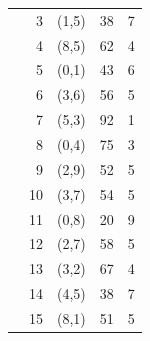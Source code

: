 \begin{longtable}{lrrrr}
 & 3 & (1,5) & 38 & 7 \\
 & 4 & (8,5) & 62 & 4 \\
 & 5 & (0,1) & 43 & 6 \\
 & 6 & (3,6) & 56 & 5 \\
 & 7 & (5,3) & 92 & 1 \\
 & 8 & (0,4) & 75 & 3 \\
 & 9 & (2,9) & 52 & 5 \\
 & 10 & (3,7) & 54 & 5 \\
 & 11 & (0,8) & 20 & 9 \\
 & 12 & (2,7) & 58 & 5 \\
 & 13 & (3,2) & 67 & 4 \\
 & 14 & (4,5) & 38 & 7 \\
 & 15 & (8,1) & 51 & 5 \\
\midrule
\bottomrule
\end{longtable}
